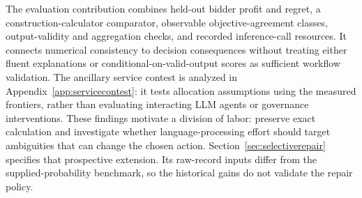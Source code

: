 \documentclass[sigconf,anonymous,nonacm]{acmart}
\begin{document}
The evaluation contribution combines held-out bidder profit and regret, a construction-calculator comparator, observable objective-agreement classes, output-validity and aggregation checks, and recorded inference-call resources. It connects numerical consistency to decision consequences without treating either fluent explanations or conditional-on-valid-output scores as sufficient workflow validation. The ancillary service contest is analyzed in Appendix~\ref{app:servicecontest}: it tests allocation assumptions using the measured frontiers, rather than evaluating interacting LLM agents or governance interventions.
These findings motivate a division of labor: preserve exact calculation and investigate whether language-processing effort should target ambiguities that can change the chosen action. Section~\ref{sec:selectiverepair} specifies that prospective extension. Its raw-record inputs differ from the supplied-probability benchmark, so the historical gains do not validate the repair policy.
\end{document}

